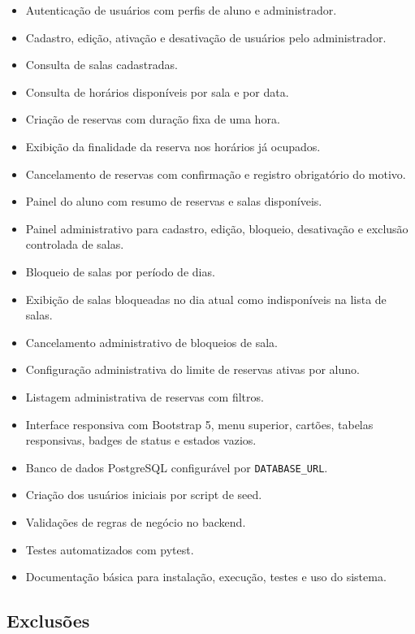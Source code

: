 \documentclass[12pt,a4paper]{article}
\begin{document}
\begin{itemize}
    \item Autenticação de usuários com perfis de aluno e administrador.
    \item Cadastro, edição, ativação e desativação de usuários pelo administrador.
    \item Consulta de salas cadastradas.
    \item Consulta de horários disponíveis por sala e por data.
    \item Criação de reservas com duração fixa de uma hora.
    \item Exibição da finalidade da reserva nos horários já ocupados.
    \item Cancelamento de reservas com confirmação e registro obrigatório do motivo.
    \item Painel do aluno com resumo de reservas e salas disponíveis.
    \item Painel administrativo para cadastro, edição, bloqueio, desativação e exclusão controlada de salas.
    \item Bloqueio de salas por período de dias.
    \item Exibição de salas bloqueadas no dia atual como indisponíveis na lista de salas.
    \item Cancelamento administrativo de bloqueios de sala.
    \item Configuração administrativa do limite de reservas ativas por aluno.
    \item Listagem administrativa de reservas com filtros.
    \item Interface responsiva com Bootstrap 5, menu superior, cartões, tabelas responsivas, badges de status e estados vazios.
    \item Banco de dados PostgreSQL configurável por \texttt{DATABASE\_URL}.
    \item Criação dos usuários iniciais por script de seed.
    \item Validações de regras de negócio no backend.
    \item Testes automatizados com pytest.
    \item Documentação básica para instalação, execução, testes e uso do sistema.
\end{itemize}

\subsection{Exclusões}
\end{document}
